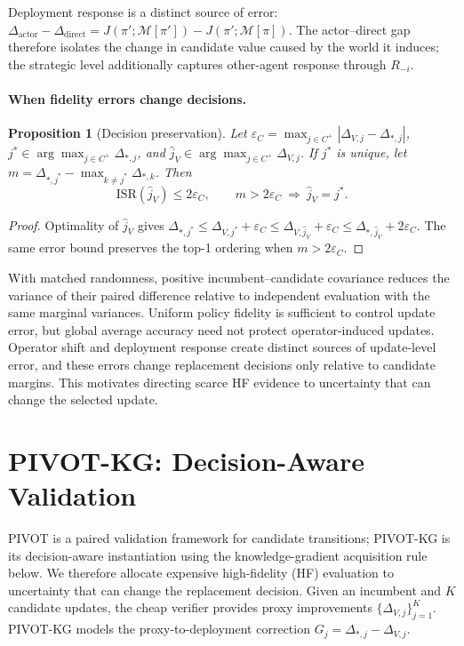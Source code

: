 \documentclass{article}
\newcommand{\M}{\mathcal{M}}
\newcommand{\pii}{\pi}
\newcommand{\pip}{\pi'}
\newtheorem{proposition}{Proposition}
\begin{document}
Deployment response is a distinct source of error:
$\Delta_{\mathrm{actor}}-\Delta_{\mathrm{direct}}
=J(\pip;\M[\pip])-J(\pip;\M[\pii])$.
The actor--direct gap therefore isolates the change in candidate value caused
by the world it induces; the strategic level additionally captures other-agent
response through $R_{-i}$.

\paragraph{When fidelity errors change decisions.}
\begin{proposition}[Decision preservation]\label{prop:decision-preservation}
Let $\varepsilon_C=\max_{j\in C^+}|\Delta_{V,j}-\Delta_{*,j}|$,
$j^*\in\arg\max_{j\in C^+}\Delta_{*,j}$, and
$\hat j_V\in\arg\max_{j\in C^+}\Delta_{V,j}$. If $j^*$ is unique, let
$m=\Delta_{*,j^*}-\max_{k\neq j^*}\Delta_{*,k}$. Then
\begin{equation}
  \mathrm{ISR}(\hat j_V)\leq2\varepsilon_C,
  \qquad
  m>2\varepsilon_C\ \Longrightarrow\ \hat j_V=j^*.
  \label{eq:decision-preservation}
\end{equation}
\end{proposition}
\begin{proof}
Optimality of $\hat j_V$ gives
$\Delta_{*,j^*}\leq\Delta_{V,j^*}+\varepsilon_C
\leq\Delta_{V,\hat j_V}+\varepsilon_C
\leq\Delta_{*,\hat j_V}+2\varepsilon_C$.
The same error bound preserves the top-1 ordering when $m>2\varepsilon_C$.
\end{proof}

With matched randomness, positive incumbent--candidate covariance reduces the
variance of their paired difference relative to independent evaluation with
the same marginal variances. Uniform policy fidelity is sufficient to control
update error, but global average accuracy need not protect operator-induced
updates. Operator shift and deployment response create distinct sources of
update-level error, and these errors change replacement decisions only
relative to candidate margins. This motivates directing scarce HF evidence to
uncertainty that can change the selected update.


\section{PIVOT-KG: Decision-Aware Validation}

PIVOT is a paired validation framework for candidate transitions; PIVOT-KG
is its decision-aware instantiation using the knowledge-gradient acquisition
rule below. We therefore allocate expensive high-fidelity (HF) evaluation to
uncertainty that can change the replacement decision. Given an incumbent and
$K$ candidate updates, the cheap verifier provides proxy improvements
$\{\Delta_{V,j}\}_{j=1}^K$. PIVOT-KG models the proxy-to-deployment correction
$G_j=\Delta_{*,j}-\Delta_{V,j}$.
\end{document}
